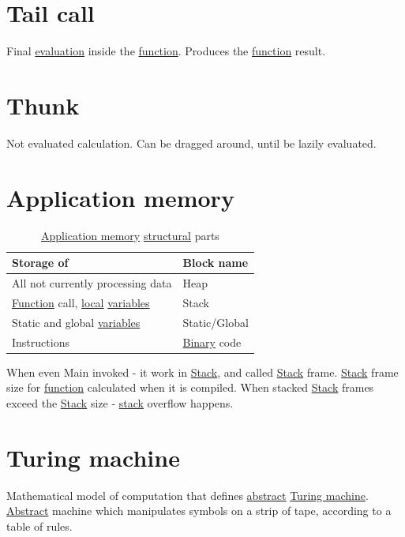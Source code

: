 \documentclass[a4paper,14pt,oneside]{book}
\begin{document}
\section{\label{orgdc46ce3}Tail call}
\label{sec:orgd425a50}
Final \hyperref[org9773515]{evaluation} inside the \hyperref[org6c914bb]{function}. Produces the \hyperref[org6c914bb]{function} result.

\section{\label{orgae519f0}Thunk}
\label{sec:org99c2829}
Not evaluated calculation. Can be dragged around, until be lazily evaluated.

\section{\label{orgcc9a2ff}Application memory}
\label{sec:org83538fb}
\begin{table}[htbp]
\caption{\label{tab--application-memory-structural-parts}\hyperref[orgcc9a2ff]{Application memory} \hyperref[org3e13d8f]{structural} parts}
\centering
\begin{tabu} spread \linewidth {ll}
\toprule
Storage of & Block name\\
\midrule
All not currently processing data & \label{org5e14e0c}Heap\\
\hyperref[org6c914bb]{Function} call, \hyperref[org74f8a54]{local} \hyperref[org70949da]{variables} & \label{orgaf1e197}Stack\\
Static and global \hyperref[org70949da]{variables} & Static/Global\\
Instructions & \hyperref[orga36d6a4]{Binary} code\\
\bottomrule
\end{tabu}
\end{table}

When even Main invoked - it work in \hyperref[orgaf1e197]{Stack}, and called \hyperref[orgaf1e197]{Stack} frame. \hyperref[orgaf1e197]{Stack} frame size for \hyperref[org6c914bb]{function} calculated when it is compiled.
When stacked \hyperref[orgaf1e197]{Stack} frames exceed the \hyperref[orgaf1e197]{Stack} size - \hyperref[orgaf1e197]{stack} overflow happens.

\section{\label{org821ef3a}Turing machine}
\label{sec:orga729c65}
Mathematical model of computation that defines \hyperref[orgc8354be]{abstract} \hyperref[org821ef3a]{Turing machine}. \hyperref[orgc8354be]{Abstract} machine which manipulates symbols on a strip of tape, according to a table of rules.
\end{document}
